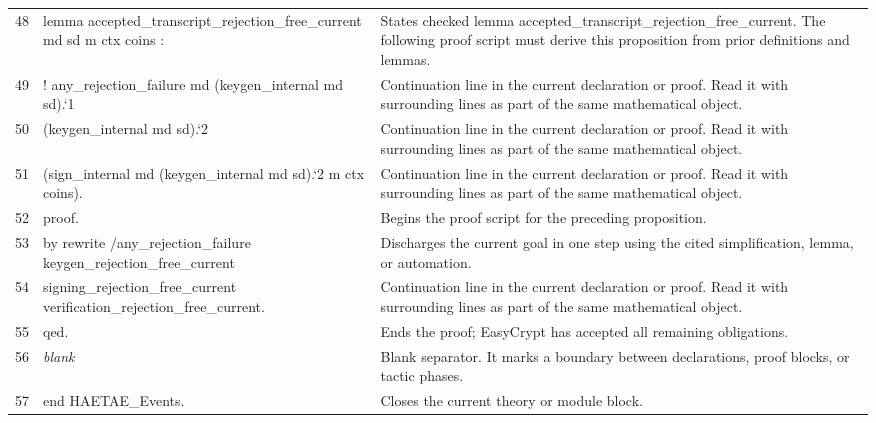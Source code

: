 \documentclass[10pt]{article}
\begin{document}
\begin{longtable}{r L{0.53\textwidth} L{0.37\textwidth}}
48 & {\ttfamily\scriptsize lemma accepted\_transcript\_rejection\_free\_current md sd m ctx coins :} & States checked lemma accepted\_transcript\_rejection\_free\_current.  The following proof script must derive this proposition from prior definitions and lemmas. \\
49 & {\ttfamily\scriptsize   ! any\_rejection\_failure md (keygen\_internal md sd).`1} & Continuation line in the current declaration or proof.  Read it with surrounding lines as part of the same mathematical object. \\
50 & {\ttfamily\scriptsize       (keygen\_internal md sd).`2} & Continuation line in the current declaration or proof.  Read it with surrounding lines as part of the same mathematical object. \\
51 & {\ttfamily\scriptsize       (sign\_internal md (keygen\_internal md sd).`2 m ctx coins).} & Continuation line in the current declaration or proof.  Read it with surrounding lines as part of the same mathematical object. \\
52 & {\ttfamily\scriptsize proof.} & Begins the proof script for the preceding proposition. \\
53 & {\ttfamily\scriptsize by rewrite /any\_rejection\_failure keygen\_rejection\_free\_current} & Discharges the current goal in one step using the cited simplification, lemma, or automation. \\
54 & {\ttfamily\scriptsize            signing\_rejection\_free\_current verification\_rejection\_free\_current.} & Continuation line in the current declaration or proof.  Read it with surrounding lines as part of the same mathematical object. \\
55 & {\ttfamily\scriptsize qed.} & Ends the proof; EasyCrypt has accepted all remaining obligations. \\
56 & {\ttfamily\scriptsize \emph{blank}} & Blank separator.  It marks a boundary between declarations, proof blocks, or tactic phases. \\
57 & {\ttfamily\scriptsize end HAETAE\_Events.} & Closes the current theory or module block. \\
\bottomrule
\end{longtable}
\end{document}
